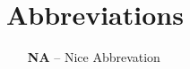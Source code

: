 
\renewcommand{\baselinestretch}{1.3}
\small\normalsize

\cleardoublepage{}
{}	
\chapter*{Abbreviations}
\label{abbrev}
\begin{itemize}[leftmargin=5\parindent]
\item[\textbf{NA}] -- Nice Abbrevation
\end{itemize}

\renewcommand{\baselinestretch}{1}
\small\normalsize



\cleartoleftpage
%